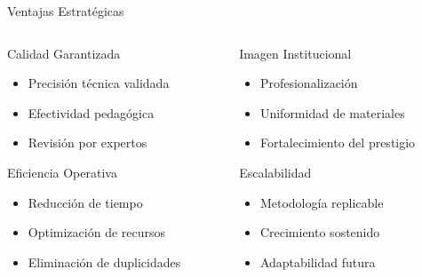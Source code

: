\documentclass[10pt,aspectratio=169]{beamer}
\begin{document}
\begin{frame}{Ventajas Estratégicas}
	\begin{columns}
		\begin{column}{0.45\textwidth}
			\begin{alertblock}{Calidad Garantizada}
				\begin{itemize}
					\item Precisión técnica validada
					\item Efectividad pedagógica
					\item Revisión por expertos
				\end{itemize}
			\end{alertblock}
			
			\begin{alertblock}{Eficiencia Operativa}
				\begin{itemize}
					\item Reducción de tiempo
					\item Optimización de recursos
					\item Eliminación de duplicidades
				\end{itemize}
			\end{alertblock}
		\end{column}
		
		\begin{column}{0.45\textwidth}
			\begin{alertblock}{Imagen Institucional}
				\begin{itemize}
					\item Profesionalización
					\item Uniformidad de materiales
					\item Fortalecimiento del prestigio
				\end{itemize}
			\end{alertblock}
			
			\begin{alertblock}{Escalabilidad}
				\begin{itemize}
					\item Metodología replicable
					\item Crecimiento sostenido
					\item Adaptabilidad futura
				\end{itemize}
			\end{alertblock}
		\end{column}
	\end{columns}
\end{frame}
\end{document}
